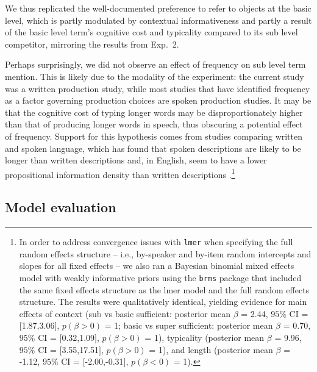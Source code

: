 \documentclass[11pt]{article}
\begin{document}
We thus replicated the well-documented preference to refer to objects at the basic level, which is partly modulated by contextual informativeness and partly a result of the basic level term's cognitive cost and typicality compared to its sub level competitor, mirroring the results from Exp.~2. 

Perhaps surprisingly, we did not observe an effect of frequency on sub level term mention. This is likely due to the modality of the experiment: the current study was a written production study, while most studies that have identified frequency as a factor governing production choices are spoken production studies. It may be that the cognitive cost of typing longer words may be disproportionately higher than that of producing longer words in speech, thus obscuring a potential effect of frequency. Support for this hypothesis comes from studies comparing written and spoken language, which has found that spoken descriptions are likely to be longer than written descriptions and, in English, seem to have a lower propositional information density than written descriptions \cite{VanMiltenburg2018}.\footnote{In order to address convergence issues with \verb+lmer+ when specifying the full random effects structure -- i.e., by-speaker and by-item random intercepts and slopes for all fixed effects -- we also ran a Bayesian binomial mixed effects model with weakly informative priors using the \verb+brms+ package \cite{brms} that included the same fixed effects structure as the lmer model and the full random effects structure. The results were qualitatively identical, yielding  evidence for main effects of context (sub vs basic sufficient: posterior mean $\beta$ = 2.44, $95\%$ CI = $[$1.87,3.06$]$, $p(\beta > 0)$ = 1; basic vs super sufficient: posterior mean $\beta$ = 0.70, $95\%$ CI = $[$0.32,1.09$]$, $p(\beta > 0)$ = 1), typicality (posterior mean $\beta$ = 9.96, $95\%$ CI = $[$3.55,17.51$]$, $p(\beta > 0)$ = 1), and length (posterior mean $\beta$ = -1.12, $95\%$ CI = $[$-2.00,-0.31$]$, $p(\beta < 0)$ = 1).} 



\subsection{Model evaluation}
\label{sec:reflevelmodel}
\end{document}
